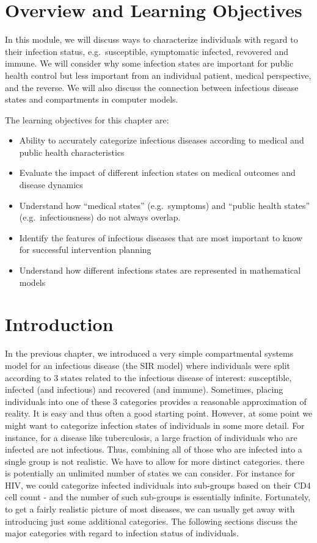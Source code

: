 \documentclass[]{book}
\providecommand{\tightlist}{%
  \setlength{\itemsep}{0pt}\setlength{\parskip}{0pt}}
\theoremstyle{definition}
\theoremstyle{definition}
\theoremstyle{definition}
\theoremstyle{remark}
\begin{document}
\section{Overview and Learning
Objectives}\label{overview-and-learning-objectives-1}

In this module, we will discuss ways to characterize individuals with
regard to their infection status, e.g.~susceptible, symptomatic
infected, revovered and immune. We will consider why some infection
states are important for public health control but less important from
an individual patient, medical perspective, and the reverse. We will
also discuss the connection between infectious disease states and
compartments in computer models.

The learning objectives for this chapter are:

\begin{itemize}
\tightlist
\item
  Ability to accurately categorize infectious diseases according to
  medical and public health characteristics
\item
  Evaluate the impact of different infection states on medical outcomes
  and disease dynamics
\item
  Understand how ``medical states'' (e.g.~symptoms) and ``public health
  states'' (e.g.~infectiousness) do not always overlap.
\item
  Identify the features of infectious diseases that are most important
  to know for successful intervention planning
\item
  Understand how different infections states are represented in
  mathematical models
\end{itemize}

\section{Introduction}\label{introduction-1}

In the previous chapter, we introduced a very simple compartmental
systems model for an infectious disease (the SIR model) where
individuals were split according to 3 states related to the infectious
disease of interest: susceptible, infected (and infectious) and
recovered (and immune). Sometimes, placing individuals into one of these
3 categories provides a reasonable approximation of reality. It is easy
and thus often a good starting point. However, at some point we might
want to categorize infection states of individuals in some more detail.
For instance, for a disease like tuberculosis, a large fraction of
individuals who are infected are not infectious. Thus, combining all of
those who are infected into a single group is not realistic. We have to
allow for more distinct categories. there is potentially an unlimited
number of states we can consider. For instance for HIV, we could
categorize infected individuals into sub-groups based on their CD4 cell
count - and the number of such sub-groups is essentially infinite.
Fortunately, to get a fairly realistic picture of most diseases, we can
usually get away with introducing just some additional categories. The
following sections discuss the major categories with regard to infection
status of individuals.
\end{document}
